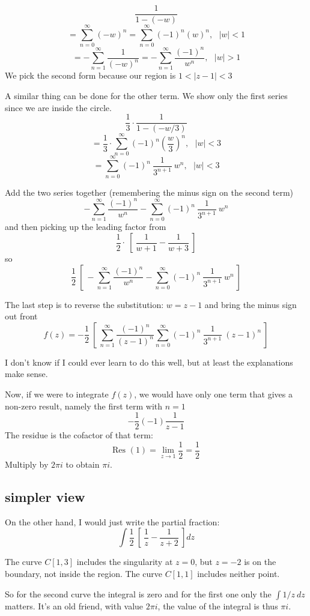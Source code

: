 \documentclass[11pt, oneside]{article}
\begin{document}
\[ \frac{1}{1 - (-w)} \]
\[ = \sum_{n=0}^{\infty} (-w)^n = \sum_{n=0}^{\infty} (-1)^n (w)^n , \ \ \ |w| < 1 \]
\[ = -\sum_{n=1}^{\infty} \frac{1}{(-w)^n} =  -\sum_{n=1}^{\infty} \frac{(-1)^n}{w^n}, \ \ \ |w| > 1 \]
We pick the second form because our region is $1 < |z-1| < 3$

A similar thing can be done for the other term.  We show only the first series since we are inside the circle.
\[  \frac{1}{3} \cdot \frac{1}{1 - (-w/3)} \]
\[ = \frac{1}{3} \cdot  \sum_{n=0}^{\infty} (-1)^n (\frac{w}{3})^n , \ \ \ |w| < 3 \]
\[ = \sum_{n=0}^{\infty} (-1)^n \ \frac{1}{3^{n+1}} \ w^n , \ \ \ |w| < 3 \]

Add the two series together (remembering the minus sign on the second term)
\[ -\sum_{n=1}^{\infty} \frac{(-1)^n}{w^n} - \sum_{n=0}^{\infty} (-1)^n \ \frac{1}{3^{n+1}} \ w^n \]
and then picking up the leading factor from 
\[ \frac{1}{2} \cdot \ [ \ \frac{1}{w+1} - \frac{1}{w+3} \ ] \]
so
\[ \frac{1}{2} \ [ \ -\sum_{n=1}^{\infty} \frac{(-1)^n}{w^n} - \sum_{n=0}^{\infty} (-1)^n \ \frac{1}{3^{n+1}} \ w^n \ ] \]

The last step is to reverse the substitution:  $w = z - 1$ and bring the minus sign out front
\[ f(z) = - \frac{1}{2} \ [ \ \sum_{n=1}^{\infty} \frac{(-1)^n}{(z-1)^n} \sum_{n=0}^{\infty} (-1)^n \ \frac{1}{3^{n+1}} \ (z-1)^n \ ] \]

I don't know if I could ever learn to do this well, but at least the explanations make sense.

Now, if we were to integrate $f(z)$, we would have only one term that gives a non-zero result, namely the first term with $n=1$
\[ - \frac{1}{2} (-1) \frac{1}{z-1} \]
The residue is the cofactor of that term:
\[ \text{Res }(1) = \lim_{z \rightarrow 1} \frac{1}{2} = \frac{1}{2} \]
Multiply by $2 \pi i$ to obtain $\pi i$.

\subsection*{simpler view}

On the other hand, I would just write the partial fraction:
\[ \int \frac{1}{2} \ [ \ \frac{1}{z} - \frac{1}{z + 2} \ ] dz \]

The curve $C[1,3]$ includes the singularity at $z = 0$, but $z = -2$ is on the boundary, not inside the region.  The curve $C[1,1]$ includes neither point.

So for the second curve the integral is zero and for the first one only the $\int 1/z \ dz$ matters.  It's an old friend, with value $2 \pi i$, the value of the integral is thus $\pi i$.
\end{document}
